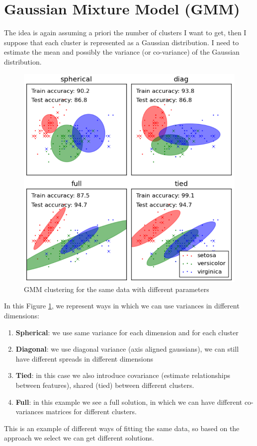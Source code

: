 \section{Gaussian Mixture Model (GMM)}
        The idea is again assuming a priori the number of clusters I want to get, then I suppose that each cluster is represented as a Gaussian distribution. I need to estimate the mean and possibly the variance (or co-variance) of the Gaussian distribution.

        \begin{figure}[ht]
            \centering
            \includegraphics[scale=0.5]{images/GMM.png}
            \caption{GMM clustering for the same data with different parameters}
            \label{fig:GMM}
        \end{figure}

        In this Figure \ref{fig:GMM}, we represent ways in which we can use variances in different dimensions:
        \begin{enumerate}
            \item \textbf{Spherical}: we use same variance for each dimension and for each cluster
            \item \textbf{Diagonal}: we use diagonal variance (axis aligned gaussians), we can still have different spreads in different dimensions
            \item \textbf{Tied}: in this case we also introduce covariance (estimate relationships between features), shared (tied) between different clusters. 
            \item \textbf{Full}: in this example we see a full solution, in which we can have different co-variances matrices for different clusters.
        \end{enumerate}
        This is an example of different ways of fitting the same data, so based on the approach we select we can get different solutions.\\

